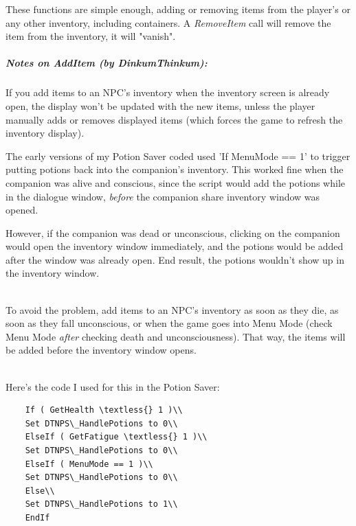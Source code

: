 These functions are simple enough, adding or removing items from the
player's or any other inventory, including containers. A
\emph{RemoveItem} call will remove the item from the inventory, it will
"vanish".

\hypertarget{notes-on-additem-by-dinkumthinkum}{%
\subparagraph{Notes on AddItem (by
DinkumThinkum):}\label{notes-on-additem-by-dinkumthinkum}}

If you add items to an NPC's inventory when the inventory screen is
already open, the display won't be updated with the new items, unless
the player manually adds or removes displayed items (which forces the
game to refresh the inventory display).

The early versions of my Potion Saver coded used 'If MenuMode == 1' to
trigger putting potions back into the companion's inventory. This worked
fine when the companion was alive and conscious, since the script would
add the potions while in the dialogue window, \emph{before} the
companion share inventory window was opened.

However, if the companion was dead or unconscious, clicking on the
companion would open the inventory window immediately, and the potions
would be added after the window was already open. End result, the
potions wouldn't show up in the inventory window.\\
\strut \\
To avoid the problem, add items to an NPC's inventory as soon as they
die, as soon as they fall unconscious, or when the game goes into Menu
Mode (check Menu Mode \emph{after} checking death and unconsciousness).
That way, the items will be added before the inventory window opens.\\
\strut \\
Here's the code I used for this in the Potion Saver:

\begin{lstlisting}
	If ( GetHealth \textless{} 1 )\\
	Set DTNPS\_HandlePotions to 0\\
	ElseIf ( GetFatigue \textless{} 1 )\\
	Set DTNPS\_HandlePotions to 0\\
	ElseIf ( MenuMode == 1 )\\
	Set DTNPS\_HandlePotions to 0\\
	Else\\
	Set DTNPS\_HandlePotions to 1\\
	EndIf
\end{lstlisting}

